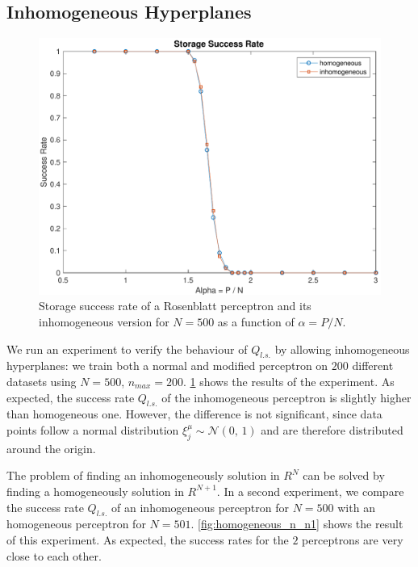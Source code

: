 \subsection{Inhomogeneous Hyperplanes}
\label{subsec:homogeneous}
\begin{figure}[t]
	\centering
	\includegraphics[width=\columnwidth]{figures/homogeneous}
    \caption{Storage success rate of a Rosenblatt perceptron and its inhomogeneous version for $N = 500$ as a function of $\alpha = P / N$.}
	\label{fig:homogeneous}
\end{figure}
We run an experiment to verify the behaviour of $Q_{l.s.}$ by allowing inhomogeneous hyperplanes:
we train both a normal and modified perceptron on $200$ different datasets using $N = 500$, $n_{max} = 200$. 
\cref{fig:homogeneous} shows the results of the experiment.
As expected, the success rate $Q_{l.s.}$ of the inhomogeneous perceptron is slightly higher than homogeneous one.
However, the difference is not significant, since data points follow a normal distribution $\xi^\mu_j \sim \mathcal{N}(0,\,1)$ and are therefore distributed around the origin.

The problem of finding an inhomogeneously solution in $R^{N}$ can be solved by finding a homogeneously solution in $R^{N + 1}$.
In a second experiment, we compare the success rate $Q_{l.s.}$ of an inhomogeneous perceptron for $N = 500$ with an homogeneous perceptron for $N = 501$.
\cref{fig:homogeneous_n_n1} shows the result of this experiment.
As expected, the success rates for the $2$ perceptrons are very close to each other.

